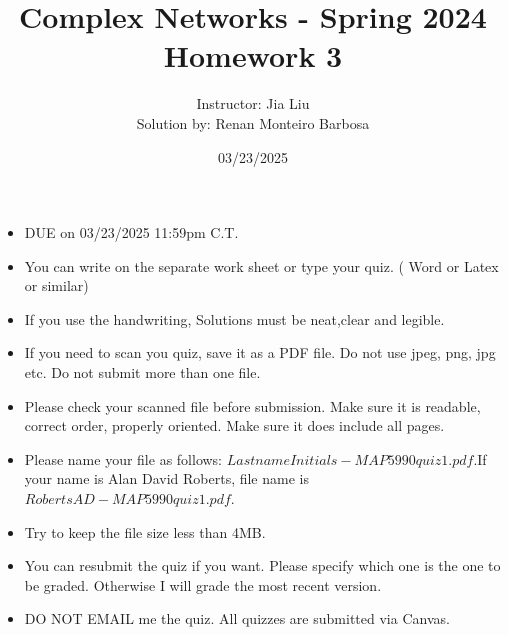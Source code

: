 \documentclass{amsart}
\theoremstyle{definition}
\theoremstyle{remark}
\numberwithin{equation}{section}
\begin{document}
\title{Complex Networks  - Spring 2024\\{\bf Homework 3}}%
\author{Instructor: Jia Liu \\ Solution by: Renan Monteiro Barbosa}%
\date{03/23/2025}


\maketitle
\begin{itemize}
\item DUE on  03/23/2025 11:59pm C.T.
\item You can write on the separate work sheet or type your quiz. ( Word or Latex or similar)
\item If you use the handwriting, Solutions must be neat,clear and legible.
\item If you need to scan you quiz, save it as a PDF file. Do not use jpeg, png, jpg etc. Do not submit more than one file.
\item Please check your scanned file before submission. Make sure it is readable, correct order, properly oriented. Make sure it does include all pages.
\item Please name your file as follows: $LastnameInitials-MAP5990quiz1.pdf$.If your name is Alan David Roberts, file name is $RobertsAD-MAP5990quiz1.pdf$.
\item Try to keep the file size less than 4MB.
\item You can resubmit the quiz if you want. Please specify which one is the one to be graded. Otherwise I will grade the most recent version.
\item DO NOT EMAIL me the quiz. All quizzes are submitted via Canvas.
\end{itemize}
\end{document}
